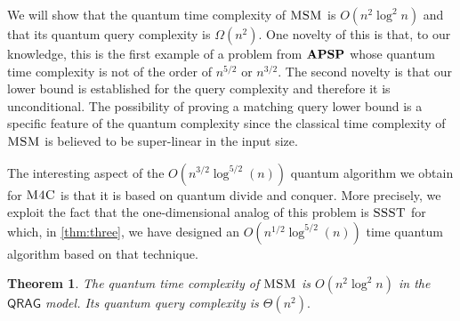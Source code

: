 \documentclass[12pt]{article}
\newcommand{\MaxSubM}{\textsc{MSM}}
\newcommand{\MaxFourC}{\textsc{M4C}}
\newcommand{\SSST}{\textsc{SSST}}
\newcommand{\APSPc}{\bf{APSP}}
\newtheorem{theorem}{Theorem}
\theoremstyle{definition}
\begin{document}
We will show that the quantum time complexity of $\MaxSubM$ is $O(n^{2} \log^2 n)$ and that its quantum query complexity is $\Omega(n^2).$ One novelty of this is that, to our knowledge, this is the first example of a problem from $\APSPc$ whose quantum time complexity is not of the order of $n^{5/2}$ or $n^{3/2}$.
The second novelty is that our lower bound is established for the query complexity and therefore it is unconditional.
The possibility of proving a matching query lower bound is a specific feature of the quantum complexity since the classical time complexity of $\MaxSubM$ is believed to be super-linear in the input size.

The interesting aspect of the ${O}(n^{3/2} \log^{5/2} (n))$ quantum algorithm we obtain for $\MaxFourC$ is that it is based on quantum divide and conquer.
More precisely, we exploit the fact that the one-dimensional analog of this problem is  $\SSST$ for which, in \cref{thm:three}, we have designed an $O(n^{1/2} \log^{5/2}(n))$ time quantum algorithm based on that technique. 

\begin{theorem}
\label{thm:msm}
The quantum time complexity of $\MaxSubM$ is $O(n^{2}\log^2 n)$ in the $\mathsf{QRAG}$ model. 
Its quantum query complexity is $\Theta(n^2).$ 
\end{theorem}
\end{document}
